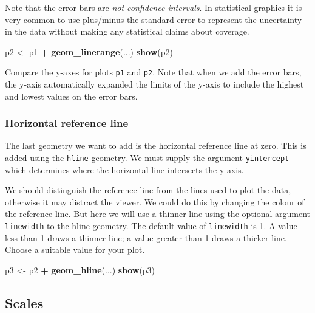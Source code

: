 \documentclass[
]{book}
\newenvironment{Shaded}{\begin{snugshade}}{\end{snugshade}}
\newcommand{\FunctionTok}[1]{\textcolor[rgb]{0.13,0.29,0.53}{\textbf{#1}}}
\newcommand{\NormalTok}[1]{#1}
\newcommand{\OtherTok}[1]{\textcolor[rgb]{0.56,0.35,0.01}{#1}}
\newcommand{\SpecialCharTok}[1]{\textcolor[rgb]{0.81,0.36,0.00}{\textbf{#1}}}
\begin{document}
Note that the error bars are \emph{not confidence intervals}. In statistical graphics it is very common to use plus/minus the standard error to represent the uncertainty in the data without making any statistical claims about coverage.

\begin{Shaded}
\begin{Highlighting}[]
\NormalTok{p2 }\OtherTok{\textless{}{-}}\NormalTok{ p1 }\SpecialCharTok{+} \FunctionTok{geom\_linerange}\NormalTok{(...)}
\FunctionTok{show}\NormalTok{(p2)}
\end{Highlighting}
\end{Shaded}

Compare the y-axes for plots \texttt{p1} and \texttt{p2}. Note that when we add the error bars, the y-axis automatically expanded the limits of the y-axis to include the highest and lowest values on the error bars.

\subsubsection{Horizontal reference line}\label{horizontal-reference-line}

The last geometry we want to add is the horizontal reference line at zero. This is added using the \texttt{hline} geometry. We must supply the argument \texttt{yintercept} which determines where the horizontal line intersects the y-axis.

We should distinguish the reference line from the lines used to plot the data, otherwise it may distract the viewer. We could do this by changing the colour of the reference line. But here we will use a thinner line using the optional argument \texttt{linewidth} to the hline geometry. The default value of \texttt{linewidth} is 1. A value less than 1 draws a thinner line; a value greater than 1 draws a thicker line. Choose a suitable value for your plot.

\begin{Shaded}
\begin{Highlighting}[]
\NormalTok{p3 }\OtherTok{\textless{}{-}}\NormalTok{ p2 }\SpecialCharTok{+} \FunctionTok{geom\_hline}\NormalTok{(...)}
\FunctionTok{show}\NormalTok{(p3)}
\end{Highlighting}
\end{Shaded}

\subsection{Scales}\label{scales}
\end{document}
